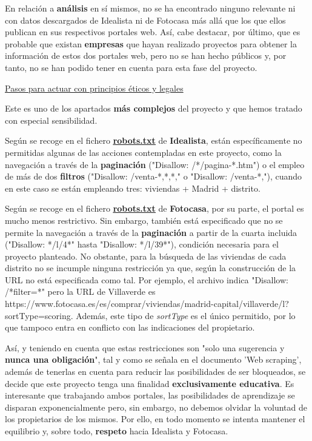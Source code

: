 \documentclass[12pt]{article}
\begin{document}
En relación a \textbf{análisis} en sí mismos, no se ha encontrado ninguno relevante ni con datos descargados de Idealista ni de Fotocasa más allá que los que ellos publican en sus respectivos portales web. Así, cabe destacar, por último, que es probable que existan \textbf{empresas} que hayan realizado proyectos para obtener la información de estos dos portales web, pero no se han hecho públicos y, por tanto, no se han podido tener en cuenta para esta fase del proyecto. 

\underline{Pasos para actuar con principios éticos y legales}

Este es uno de los apartados\textbf{ más complejos} del proyecto y que hemos tratado con especial sensibilidad.

Según se recoge en el fichero \href{https://www.idealista.com/robots.txt}{\textbf{\underline{robots.txt}}} de \textbf{Idealista}, están específicamente no permitidas algunas de las acciones contempladas en este proyecto, como la navegación a través de la \textbf{paginación} ("Disallow: /*/pagina-*.htm") o el empleo de más de dos \textbf{filtros} ("Disallow: /venta-*,*,*," o "Disallow: /venta-*,"), cuando en este caso se están empleando tres: viviendas + Madrid + distrito. 

Según se recoge en el fichero \href{https://www.fotocasa.es/robots.txt}{\textbf{\underline{robots.txt}}} de \textbf{Fotocasa}, por su parte, el portal es mucho menos restrictivo. Sin embargo, también está especificado que no se permite la navegación a través de la \textbf{paginación} a partir de la cuarta incluida ("Disallow: */l/4*" hasta "Disallow: */l/39*"), condición necesaria para el proyecto planteado. No obstante, para la búsqueda de las viviendas de cada distrito no se incumple ninguna restricción ya que, según la construcción de la URL no está especificada como tal. Por ejemplo, el archivo indica "Disallow: /*filter=*" pero la URL de Villaverde es https://www.fotocasa.es/es/comprar/viviendas/madrid-capital/villaverde/l?sortType=scoring. Además, este tipo de \textit{sortType} es el único permitido, por lo que tampoco entra en conflicto con las indicaciones del propietario. 


Así, y teniendo en cuenta que estas restricciones son "solo una sugerencia y \textbf{nunca una obligación}", tal y como se señala en el documento 'Web scraping', además de tenerlas en cuenta para reducir las posibilidades de ser bloqueados, se decide que este proyecto tenga una finalidad \textbf{exclusivamente educativa}. Es interesante que trabajando ambos portales, las posibilidades de aprendizaje se disparan exponencialmente pero, sin embargo, no debemos olvidar la voluntad de los propietarios de los mismos. Por ello, en todo momento se intenta mantener el equilibrio y, sobre todo, \textbf{respeto} hacia Idealista y Fotocasa. 
\end{document}
